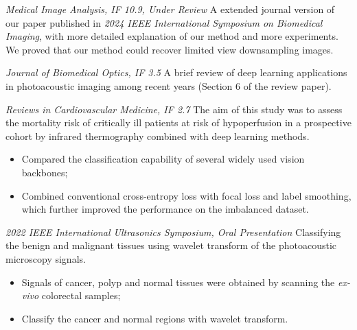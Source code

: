 \documentclass{resume}
\begin{document}
\textit{Medical Image Analysis, IF 10.9, Under Review}
A extended journal version of our paper published in \textit{2024 IEEE International Symposium on Biomedical Imaging}, with more detailed explanation of our method and more experiments. We proved that our method could recover limited view downsampling images.

\textit{Journal of Biomedical Optics, IF 3.5}
A brief review of deep learning applications in photoacoustic imaging among recent years (Section 6 of the review paper).

\textit{Reviews in Cardiovascular Medicine, IF 2.7}
The aim of this study was to assess the mortality risk of critically ill patients at risk of hypoperfusion in a prospective cohort by infrared thermography combined with deep learning methods.
\begin{itemize}
  \item Compared the classification capability of several widely used vision backbones;
  \item Combined conventional cross-entropy loss with focal loss and label smoothing, which further improved the performance on the imbalanced dataset.
\end{itemize}

\textit{2022 IEEE International Ultrasonics Symposium, Oral Presentation}
Classifying the benign and malignant tissues using wavelet transform of the photoacoustic microscopy signals.
\begin{itemize}
  \item Signals of cancer, polyp and normal tissues were obtained by scanning the \textit{ex-vivo} colorectal samples;
  \item Classify the cancer and normal regions with wavelet transform.
\end{itemize}
\end{document}
